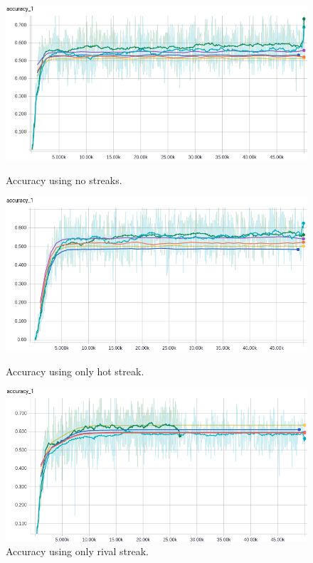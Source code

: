 \documentclass{article} %
\begin{document}
\begin{figure}[!htb]
  \includegraphics[width=\linewidth]{plots/model1/wteam_onehot/streak-/accuracy.png}
  \caption{Accuracy using no streaks.}\label{fig:wteam-onehot--accuracy}
\endminipage\hfill
{}
  \includegraphics[width=\linewidth]{plots/model1/wteam_onehot/streak-h/accuracy.png}
  \caption{Accuracy using only hot streak.}\label{fig:wteam-onehot-h-accuracy}
\endminipage\hfill
{}%
  \includegraphics[width=\linewidth]{plots/model1/wteam_onehot/streak-r/accuracy.png}
  \caption{Accuracy using only rival streak.}\label{fig:wteam-onehot-r-accuracy}

\end{figure}
\end{document}
